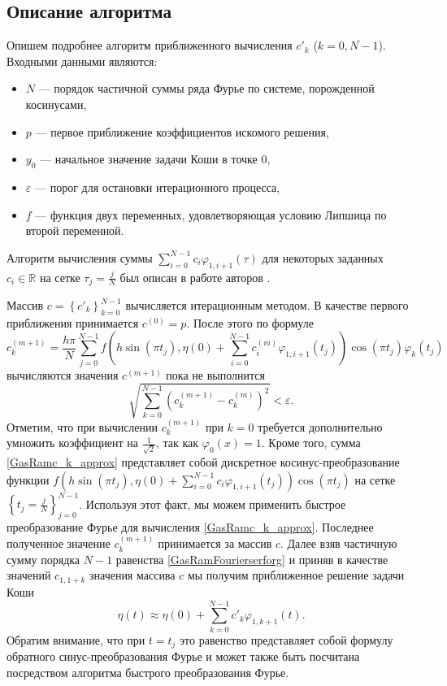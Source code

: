 \subsection{Описание алгоритма}
Опишем подробнее алгоритм приближенного вычисления $c'_k$ ($k=\overline{0, N-1}$).
Входными данными являются:
\begin{itemize}
	\item
	$N$ --- порядок частичной суммы ряда Фурье по системе, порожденной косинусами,
	\item
	$p$ --- первое приближение коэффициентов искомого решения,
	\item
	$y_0$ --- начальное значение задачи Коши в точке 0,
	\item
	$\varepsilon$ --- порог для остановки итерационного процесса,
	\item
	$f$ --- функция двух переменных, удовлетворяющая условию Липшица по второй переменной.
\end{itemize}
Алгоритм вычисления суммы
$\sum_{i=0}^{N-1} c_{i}\varphi_{1,i+1}(\tau)$ для некоторых заданных $c_i \in \mathbb{R}$ на сетке $\tau_j = \frac{j}{N}$ был описан в работе авторов \cite{AGG_GRM}.

Массив $c = \left\{c'_k\right\}_{k=0}^{N-1}$ вычисляется итерационным методом. В качестве первого приближения принимается $c^{(0)} = p$. После этого по формуле
\begin{equation} \label{GasRamc_k_approx}
	c^{(m+1)}_k = \frac{h\pi}N \sum_{j=0}^{N-1} f\left(h\sin (\pi t_j), \eta(0) + \sum_{i=0}^{N-1} c^{(m)}_{i}\varphi_{1,i+1}(t_j)\right) \cos (\pi t_j) \varphi_k(t_j)
\end{equation}
вычисляются значения $c^{(m+1)}$ пока не выполнится
\begin{equation*}
	\sqrt{\sum_{k=0}^{N-1} (c_k^{(m+1)} - c_k^{(m)} )^2} < \varepsilon.
\end{equation*}
Отметим, что при вычислении $c^{(m+1)}_k$ при $k=0$ требуется дополнительно умножить коэффициент на $\frac{1}{\sqrt{2}}$, так как $\varphi_0(x) = 1$.
Кроме того, сумма \eqref{GasRamc_k_approx} представляет собой дискретное косинус-преобразование функции $f\left(h\sin (\pi t_j), \eta(0) + \sum_{i=0}^{N-1} c_{i}\varphi_{1,i+1}(t_j)\right) \cos (\pi t_j)$ на сетке $\left\{t_j = \frac{j}{N}\right\}_{j=0}^{N-1}$. Используя этот факт, мы можем применить быстрое преобразование Фурье для вычисления \eqref{GasRamc_k_approx}.
Последнее полученное значение $c_k^{(m+1)}$ принимается за массив $c$. Далее взяв частичную сумму порядка $N-1$ равенства \eqref{GasRamFourierserforg} и приняв в качестве значений $c_{1,1+k}$ значения массива $c$ мы получим приближенное решение задачи Коши
\begin{equation*}
	\eta(t) \approx \eta(0) + \sum_{k=0}^{N-1} c'_k \varphi_{1,k+1} (t).
\end{equation*}
Обратим внимание, что при $t = t_j$ это равенство представляет собой формулу обратного синус-преобразования Фурье и может также быть посчитана посредством алгоритма быстрого преобразования Фурье.

